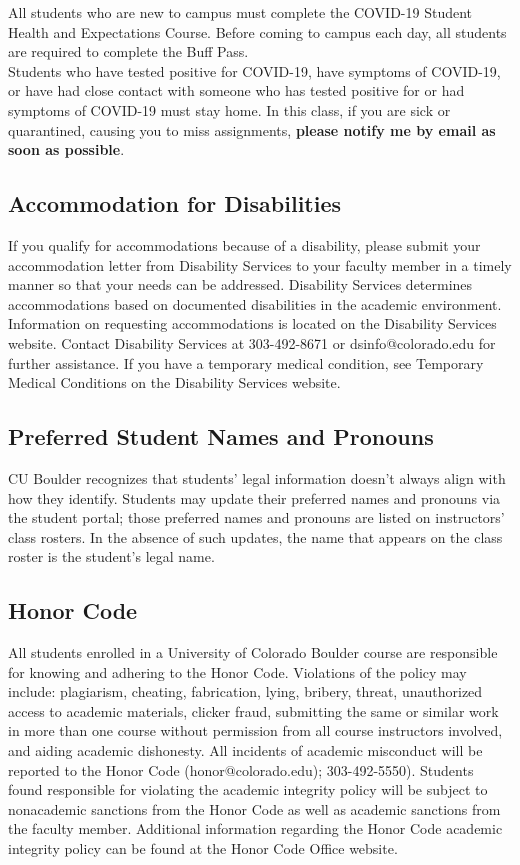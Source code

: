 \documentclass[9pt]{article}
\begin{document}
{All students who are new to campus must complete the COVID-19 Student Health and Expectations Course. Before coming to campus each day, all students are required to complete the Buff Pass.\\

Students who have tested positive for COVID-19, have symptoms of COVID-19, or have had close contact with someone who has tested positive for or had symptoms of COVID-19 must stay home. In this class, if you are sick or quarantined, causing you to miss assignments, \textbf{please notify me by email as soon as possible}.

\subsection{Accommodation for Disabilities}

If you qualify for accommodations because of a disability, please submit your accommodation letter from Disability Services to your faculty member in a timely manner so that your needs can be addressed.  Disability Services determines accommodations based on documented disabilities in the academic environment.  Information on requesting accommodations is located on the Disability Services website. Contact Disability Services at 303-492-8671 or dsinfo@colorado.edu for further assistance.  If you have a temporary medical condition, see Temporary Medical Conditions on the Disability Services website.

\subsection{Preferred Student Names and Pronouns}

CU Boulder recognizes that students' legal information doesn't always align with how they identify. Students may update their preferred names and pronouns via the student portal; those preferred names and pronouns are listed on instructors' class rosters. In the absence of such updates, the name that appears on the class roster is the student's legal name.

\subsection{Honor Code}

All students enrolled in a University of Colorado Boulder course are responsible for knowing and adhering to the Honor Code. Violations of the policy may include: plagiarism, cheating, fabrication, lying, bribery, threat, unauthorized access to academic materials, clicker fraud, submitting the same or similar work in more than one course without permission from all course instructors involved, and aiding academic dishonesty. All incidents of academic misconduct will be reported to the Honor Code (honor@colorado.edu); 303-492-5550). Students found responsible for violating the academic integrity policy will be subject to nonacademic sanctions from the Honor Code as well as academic sanctions from the faculty member. Additional information regarding the Honor Code academic integrity policy can be found at the Honor Code Office website.

}
\end{document}
